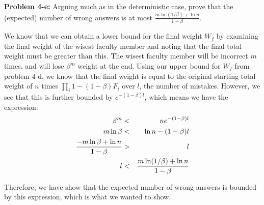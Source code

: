 \documentclass[psamsfonts]{amsart}
\newenvironment{sol}{\vspace{0.25cm}{\large \bfseries Solution:}}{\qedsymbol}
\newenvironment{prob}[1]{\begin{framed}{\large \bfseries Problem #1:}}{\end{framed}}
\begin{document}
\begin{prob}{4-e}
Arguing much as in the deterministic case, prove that the (expected) number of wrong answers is at most $\frac{m \ln (1/\beta) + \ln n}{1 - \beta}$. 
\end{prob}
\begin{sol}
We know that we can obtain a lower bound for the final weight $W_f$ by examining the final weight of the wisest faculty member and noting that the final total weight must be greater than this. The wisest faculty member will be incorrect $m$ times, and will lose $\beta^m$ weight at the end. Using our upper bound for $W_f$ from problem 4-d, we know that the final weight is equal to the original starting total weight of $n$ times $\prod_i 1 - (1 - \beta)F_i$ over $l$, the number of mistakes. However, we see that this is further bounded by $e^{-(1 - \beta) l}$, which means we have the expression:
\begin{eqnarray}
\beta^m &<& n e^{-(1 - \beta) l} \\
m \ln \beta &<& \ln n - (1 - \beta) l \\
{{-m \ln \beta + \ln n} \over {1 - \beta}} &>& l \\
l &<& {{m \ln (1/\beta) + \ln n} \over {1 - \beta}}
\end{eqnarray}

Therefore, we have show that the expected number of wrong answers is bounded by this expression, which is what we wanted to show.
\end{sol}
\end{document}
